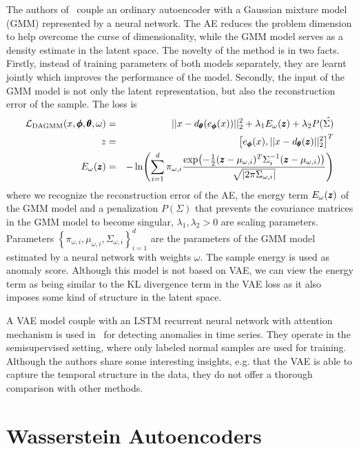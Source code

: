 The authors of~\cite{zong2018deep} couple an ordinary autoencoder
with a Gaussian mixture model (GMM) represented by a neural network.
The AE reduces the problem dimension to help overcome the curse of
dimensionality, while the GMM model serves as a density estimate in
the latent space. The novelty of the method is in two facts. Firstly,
instead of training parameters of both models separately, they are
learnt jointly which improves the performance of the model. Secondly,
the input of the GMM model is not only the latent representation,
but also the reconstruction error of the sample. The loss is 
\begin{eqnarray}
\mathcal{L}_{\text{DAGMM}}(x,\vc{\phi},\vc{\theta},\omega) & = & ||x-d_{\vc{\theta}}(e_{\vc{\phi}}(x))||_{2}^{2}+\lambda_{1}E_{\omega}(\vc{z})+\lambda_{2}P(\hat{\Sigma)}\\
z & = & \left[e_{\vc{\phi}}(x),||x-d_{\vc{\theta}}(\vc{z})||_{2}^{2}\right]^{T}\\
E_{\omega}(\vc{z}) & = & -\ln\left(\sum_{i=1}^{d}\pi_{\omega,i}\frac{\exp\left(-\frac{1}{2}(\vc{z}-\mu_{\omega,i})^{T}\Sigma_{i}^{-1}(\vc{z}-\mu_{\omega,i})\right)}{\sqrt{|2\pi\Sigma_{\omega,i}|}}\right)
\end{eqnarray}
where we recognize the reconstruction error of the AE, the energy
term $E_{\omega}(\pmb{{z}})$ of the GMM model and a penalization $P(\Sigma)$
that prevents the covariance matrices in the GMM model to become singular,
$\lambda_{1},\lambda_{2}>0$ are scaling parameters. Parameters $\left\{ \pi_{\omega,i},\mu_{\omega,i},\Sigma_{\omega,i}\right\} _{i=1}^{d}$
are the parameters of the GMM model estimated by a neural network
with weights $\omega$. The sample energy is used as anomaly score.
Although this model is not based on VAE, we can view the energy term
as being similar to the KL divergence term in the VAE loss as it also
imposes some kind of structure in the latent space.

A VAE model couple with an LSTM recurrent neural network with attention
mechanism is used in~\cite{pereira2018unsupervised} for detecting
anomalies in time series. They operate in the semisupervised setting,
where only labeled normal samples are used for training. Although
the authors share some interesting insights, e.g. that the VAE is
able to capture the temporal structure in the data, they do not offer
a thorough comparison with other methods.


\section{Wasserstein Autoencoders}

